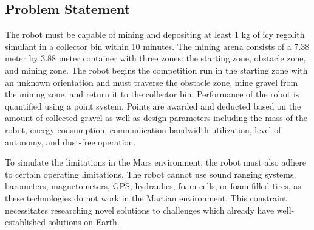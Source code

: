 \documentclass[class=article, crop=false]{standalone}
\begin{document}
	\subsection{Problem Statement}
	\label{subsec:problem_statement}
	The robot must be capable of mining and depositing at least 1 kg of icy regolith simulant in a collector bin within 10 minutes. The mining arena consists of a 7.38 meter by 3.88 meter container with three zones: the starting zone, obstacle zone, and mining zone. The robot begins the competition run in the starting zone with an unknown orientation and must traverse the obstacle zone, mine gravel from the mining zone, and return it to the collector bin. Performance of the robot is quantified using a point system. Points are awarded and deducted based on the amount of collected gravel as well as design parameters including  the mass of the robot, energy consumption, communication bandwidth utilization, level of autonomy, and dust-free operation. 
	
	
	To simulate the limitations in the Mars environment, the robot must also adhere to certain operating limitations. The robot cannot use sound ranging systems, barometers, magnetometers, GPS, hydraulics, foam cells, or foam-filled tires, as these technologies do not work in the Martian environment. This constraint necessitates researching novel solutions to challenges which already have well-established solutions on Earth.




	
\end{document}
